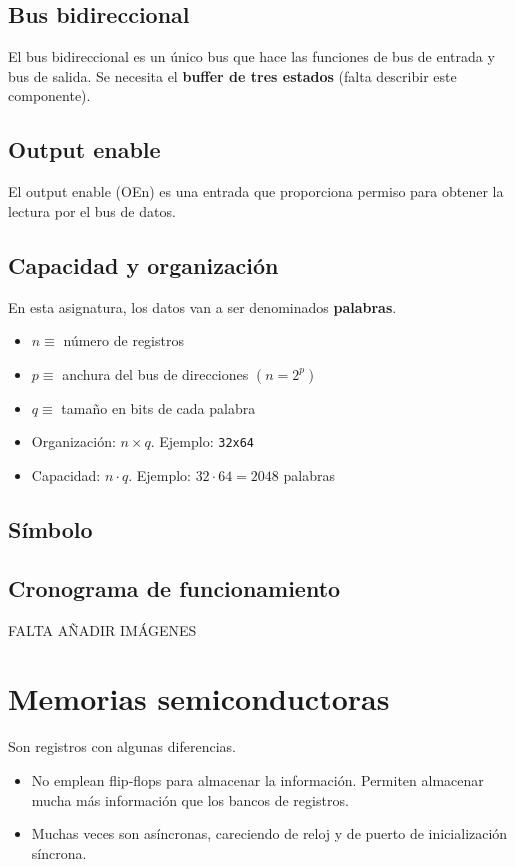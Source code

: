 \documentclass[a4paper]{book}
\begin{document}
\subsection{Bus bidireccional}

El bus bidireccional es un único bus que hace las funciones de bus de entrada y bus de salida. Se necesita el \textbf{buffer de tres estados} (falta describir este componente).

\subsection{Output enable}

El output enable (OEn) es una entrada que proporciona permiso para obtener la lectura por el bus de datos.

\subsection{Capacidad y organización}

En esta asignatura, los datos van a ser denominados \textbf{palabras}.
\begin{itemize}
	 \item $n \equiv $ número de registros
	 \item $p \equiv $ anchura del bus de direcciones $\left( n=2^p \right)$
	 \item $q \equiv $ tamaño en bits de cada palabra
	 \item Organización: $n\times q$. Ejemplo: \verb|32x64|
	 \item Capacidad: $n\cdot q$. Ejemplo: $32 \cdot 64 = 2048$ palabras
\end{itemize}

\subsection{Símbolo}

\subsection{Cronograma de funcionamiento}

FALTA AÑADIR IMÁGENES

\section{Memorias semiconductoras}

Son registros con algunas diferencias.
\begin{itemize}
	 \item No emplean flip-flops para almacenar la información. Permiten almacenar mucha más información que los bancos de registros.
	 \item Muchas veces son asíncronas, careciendo de reloj y de puerto de inicialización síncrona.
\end{itemize}
\end{document}
